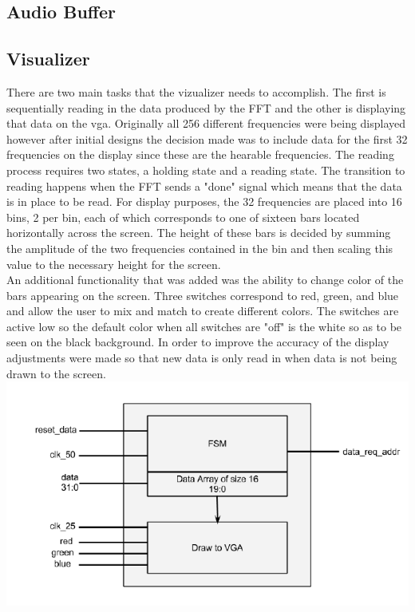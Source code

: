 \documentclass{article}
\begin{document}
\subsection{Audio Buffer}

\subsection{Visualizer} There are two main tasks that the vizualizer needs to accomplish.  The first is sequentially reading in the data produced by the FFT and the other is displaying that data on the vga.  Originally all 256 different frequencies were being displayed however after initial designs the decision made was to include data for the first 32 frequencies on the display since these are the hearable frequencies.  The reading process requires two states, a holding state and a reading state.  The transition to reading happens when the FFT sends a "done" signal which means that the data is in place to be read.  For display purposes, the 32 frequencies are placed into 16 bins, 2 per bin, each of which corresponds to one of sixteen bars located horizontally across the screen.  The height of these bars is decided by summing the amplitude of the two frequencies contained in the bin and then scaling this value to the necessary height for the screen.\\An additional functionality that was added was the ability to change color of the bars appearing on the screen.  Three switches correspond to red, green, and blue and allow the user to mix and match to create different colors.  The switches are active low so the default color when all switches are "off" is the white so as to be seen on the black background.  In order to improve the accuracy of the display adjustments were made so that new data is only read in when data is not being drawn to the screen.
  \includegraphics[width=20 cm]{viz_block_diagram.png}
\end{document}
